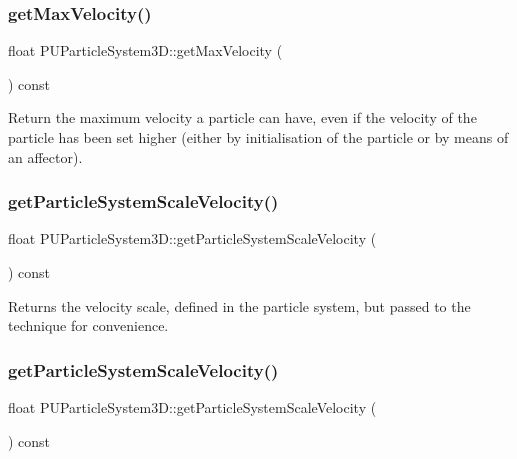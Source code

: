 \subsubsection{\texorpdfstring{get\+Max\+Velocity()}{getMaxVelocity()}\hspace{0.1cm}{\footnotesize\ttfamily [2/2]}}
{\footnotesize\ttfamily float P\+U\+Particle\+System3\+D\+::get\+Max\+Velocity (\begin{DoxyParamCaption}{ }\end{DoxyParamCaption}) const}

Return the maximum velocity a particle can have, even if the velocity of the particle has been set higher (either by initialisation of the particle or by means of an affector). \mbox{\label{classPUParticleSystem3D_ada896efd6a52b7ac28e28b14e7ac6515}} 
\subsubsection{\texorpdfstring{get\+Particle\+System\+Scale\+Velocity()}{getParticleSystemScaleVelocity()}\hspace{0.1cm}{\footnotesize\ttfamily [1/2]}}
{\footnotesize\ttfamily float P\+U\+Particle\+System3\+D\+::get\+Particle\+System\+Scale\+Velocity (\begin{DoxyParamCaption}{ }\end{DoxyParamCaption}) const}

Returns the velocity scale, defined in the particle system, but passed to the technique for convenience. \mbox{\label{classPUParticleSystem3D_ada896efd6a52b7ac28e28b14e7ac6515}} 
\subsubsection{\texorpdfstring{get\+Particle\+System\+Scale\+Velocity()}{getParticleSystemScaleVelocity()}\hspace{0.1cm}{\footnotesize\ttfamily [2/2]}}
{\footnotesize\ttfamily float P\+U\+Particle\+System3\+D\+::get\+Particle\+System\+Scale\+Velocity (\begin{DoxyParamCaption}{ }\end{DoxyParamCaption}) const}

